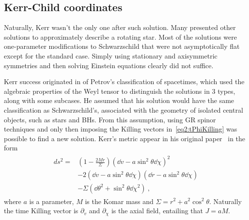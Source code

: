\subsection{Kerr-Child coordinates}

Naturally, Kerr wasn't the only one after such solution.
Many presented other solutions to approximately describe a rotating star. 
Most of the solutions were one-parameter modifications to Schwarzschild that were not asymptotically flat except for the standard case. 
Simply using stationary and axisymmetric symmetries and then solving Einstein equations clearly did not suffice.

Kerr success originated in of Petrov's classification of spacetimes, which used the algebraic properties of the Weyl tensor to distinguish the solutions in 3 types, along with some subcases.
He assumed that his solution would have the same classification as Schwarzschild's, associated with the geometry of isolated central objects, such as stars and BHs. 
From this assumption, using GR spinor techniques and only then imposing the Killing vectors in~\eqref{eq2:tPhiKilling} was possible to find a new solution. 
Kerr's metric appear in his original paper~\cite{Kerr1963} in the form
\begin{align}
    \begin{split}
        ds^2 = & \left(1 - \frac{2 M r}{\Sigma} \right) (\dd v - a \sin^2\theta \dd \chi )^2 \\
        & - 2  (\dd v - a \sin^2\theta \dd \chi )  (\dd r - a \sin^2\theta \dd \chi ) \\
        & - \Sigma (\dd \theta^2 + \sin^2\theta \dd \chi^2 ) ~,
    \end{split}
    \label{eq2:KerrIngoingEF}
\end{align}
where $a$ is a parameter, $M$ is the Komar mass and $\Sigma = r^2 + a^2 \cos^2\theta$. Naturally the time Killing vector is $\partial_v$ and $\partial_\chi$ is the axial field, entailing that $J = a M$.

